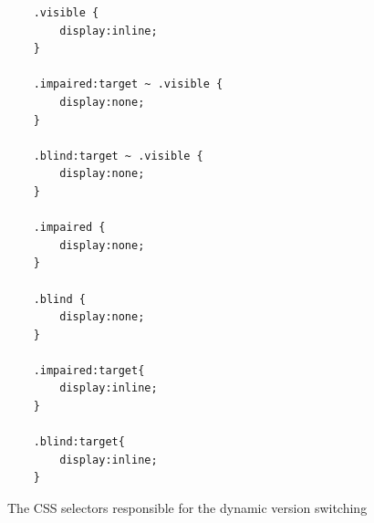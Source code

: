 \begin{figure}
	
	\begin{lstlisting}
	.visible {
		display:inline; 
	}
	
	.impaired:target ~ .visible {
		display:none; 
	}
	
	.blind:target ~ .visible {
		display:none; 
	}
	
	.impaired {
		display:none; 
	}
	
	.blind {
		display:none; 
	}
	
	.impaired:target{
		display:inline; 
	}
	
	.blind:target{
		display:inline; 
	}
	\end{lstlisting}
	\caption{The CSS selectors responsible for the dynamic version switching}
	\label{fig:css_selector}
\end{figure}

